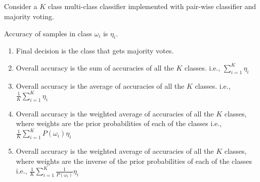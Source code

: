 \begin{frame}
\section{}
Consider a $K$ class multi-class classifier implemented with pair-wise classifier and majority voting.

Accuracy of samples in class $\omega_i$ is $\eta_i$.
\begin{enumerate}[label=(\Alph*)]
\item Final decision is the class that gets majority votes.   %
\item Overall accuracy is the sum of accuracies of all the $K$ classes. i.e., $\sum_{i=1}^K \eta_i$
\item Overall accuracy is the average of accuracies of all the $K$ classes. i.e., $\frac{1}{K}\sum_{i=1}^K \eta_i$
\item Overall accuracy is the weighted average of accuracies of all the $K$ classes, where weights are the prior probabilities of each of the classes i.e., $\frac{1}{K}\sum_{i=1}^K P(\omega_i) \eta_i$    %
\item Overall accuracy is the weighted average of accuracies of all the $K$ classes, where weights are the inverse of the prior probabilities of each of the classes i.e., $\frac{1}{K}\sum_{i=1}^K \frac{1}{P(\omega_i)} \eta_i$
\end{enumerate}
\end{frame}
